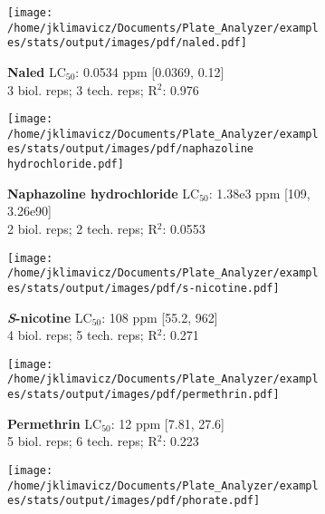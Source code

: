 \documentclass{article}
\begin{document}
\begin{figure}[thp!]
   \begin{subfigure}{0.500\textwidth}
      \centering
      \texttt{[image: /home/jklimavicz/Documents/Plate\_Analyzer/examples/stats/output/images/pdf/naled.pdf]}
      \vspace{-0.05cm}
      \caption*{\textbf{Naled} LC$_{50}$: 0.0534 ppm [0.0369, 0.12] \\ 
3 biol. reps; 3 tech. reps; R$^2$: 0.976}
      \vspace{0.1cm}
   \end{subfigure}%
   \begin{subfigure}{0.500\textwidth}
      \centering
      \texttt{[image: /home/jklimavicz/Documents/Plate\_Analyzer/examples/stats/output/images/pdf/naphazoline hydrochloride.pdf]}
      \vspace{-0.05cm}
      \caption*{\textbf{Naphazoline hydrochloride} LC$_{50}$: 1.38e3 ppm [109, 3.26e90] \\ 
2 biol. reps; 2 tech. reps; R$^2$: 0.0553}
      \vspace{0.1cm}
   \end{subfigure}%
\vspace{-0.1cm}
   \begin{subfigure}{0.500\textwidth}
      \centering
      \texttt{[image: /home/jklimavicz/Documents/Plate\_Analyzer/examples/stats/output/images/pdf/s-nicotine.pdf]}
      \vspace{-0.05cm}
      \caption*{\textbf{\textit{S}-nicotine} LC$_{50}$: 108 ppm [55.2, 962] \\ 
4 biol. reps; 5 tech. reps; R$^2$: 0.271}
      \vspace{0.1cm}
   \end{subfigure}%
   \begin{subfigure}{0.500\textwidth}
      \centering
      \texttt{[image: /home/jklimavicz/Documents/Plate\_Analyzer/examples/stats/output/images/pdf/permethrin.pdf]}
      \vspace{-0.05cm}
      \caption*{\textbf{Permethrin} LC$_{50}$: 12 ppm [7.81, 27.6] \\ 
5 biol. reps; 6 tech. reps; R$^2$: 0.223}
      \vspace{0.1cm}
   \end{subfigure}%
\vspace{-0.1cm}
   \begin{subfigure}{0.500\textwidth}
      \centering
      \texttt{[image: /home/jklimavicz/Documents/Plate\_Analyzer/examples/stats/output/images/pdf/phorate.pdf]}

\end{subfigure}
\end{figure}
\end{document}
